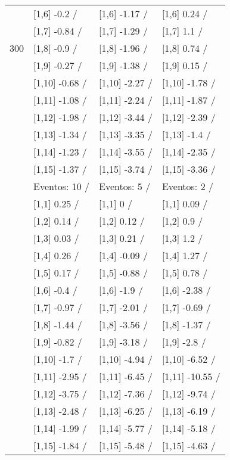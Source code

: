 \begin{table}
\begin{tabular}[t]{llll}
 & {}[1,6] -0.2  / & {}[1,6] -1.17  / & {}[1,6] 0.24  /\\
 & {}[1,7] -0.84  / & {}[1,7] -1.29  / & {}[1,7] 1.1  /\\
300 & {}[1,8] -0.9  / & {}[1,8] -1.96  / & {}[1,8] 0.74  /\\
\addlinespace
 & {}[1,9] -0.27  / & {}[1,9] -1.38  / & {}[1,9] 0.15  /\\
 & {}[1,10] -0.68  / & {}[1,10] -2.27  / & {}[1,10] -1.78  /\\
 & {}[1,11] -1.08  / & {}[1,11] -2.24  / & {}[1,11] -1.87  /\\
 & {}[1,12] -1.98  / & {}[1,12] -3.44  / & {}[1,12] -2.39  /\\
 & {}[1,13] -1.34  / & {}[1,13] -3.35  / & {}[1,13] -1.4  /\\
\addlinespace
 & {}[1,14] -1.23  / & {}[1,14] -3.55  / & {}[1,14] -2.35  /\\
 & {}[1,15] -1.37  / & {}[1,15] -3.74  / & {}[1,15] -3.36  /\\
 & Eventos:  10 / & Eventos:  5 / & Eventos:  2 /\\
 & {}[1,1] 0.25  / & {}[1,1] 0  / & {}[1,1] 0.09  /\\
 & {}[1,2] 0.14  / & {}[1,2] 0.12  / & {}[1,2] 0.9  /\\
\addlinespace
 & {}[1,3] 0.03  / & {}[1,3] 0.21  / & {}[1,3] 1.2  /\\
 & {}[1,4] 0.26  / & {}[1,4] -0.09  / & {}[1,4] 1.27  /\\
 & {}[1,5] 0.17  / & {}[1,5] -0.88  / & {}[1,5] 0.78  /\\
 & {}[1,6] -0.4  / & {}[1,6] -1.9  / & {}[1,6] -2.38  /\\
 & {}[1,7] -0.97  / & {}[1,7] -2.01  / & {}[1,7] -0.69  /\\
\addlinespace
500 & {}[1,8] -1.44  / & {}[1,8] -3.56  / & {}[1,8] -1.37  /\\
 & {}[1,9] -0.82  / & {}[1,9] -3.18  / & {}[1,9] -2.8  /\\
 & {}[1,10] -1.7  / & {}[1,10] -4.94  / & {}[1,10] -6.52  /\\
 & {}[1,11] -2.95  / & {}[1,11] -6.45  / & {}[1,11] -10.55  /\\
 & {}[1,12] -3.75  / & {}[1,12] -7.36  / & {}[1,12] -9.74  /\\
\addlinespace
 & {}[1,13] -2.48  / & {}[1,13] -6.25  / & {}[1,13] -6.19  /\\
 & {}[1,14] -1.99  / & {}[1,14] -5.77  / & {}[1,14] -5.18  /\\
 & {}[1,15] -1.84  / & {}[1,15] -5.48  / & {}[1,15] -4.63  /\\
\bottomrule
\end{tabular}
\end{table}

